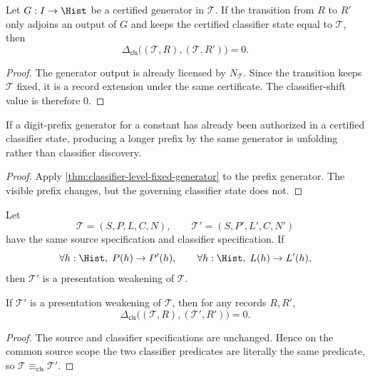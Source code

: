 \begin{theorem}
\label{thm:classifier-level-fixed-generator}
Let $G:I\to\Hist$ be a certified generator in $\mathcal T$. If the transition
from $R$ to $R'$ only adjoins an output of $G$ and keeps the certified
classifier state equal to $\mathcal T$, then
$$
\Delta_{\mathsf{cls}}\bigl((\mathcal T,R),(\mathcal T,R')\bigr)=0.
$$
\end{theorem}
\begin{proof}
The generator output is already licensed by $N_{\mathcal T}$. Since the
transition keeps $\mathcal T$ fixed, it is a record extension under the same
certificate. The classifier-shift value is therefore $0$.
\end{proof}

\begin{corollary}
\label{cor:digit-extension-is-unfolding}
If a digit-prefix generator for a constant has already been authorized in a
certified classifier state, producing a longer prefix by the same generator is
unfolding rather than classifier discovery.
\end{corollary}
\begin{proof}
Apply \autoref{thm:classifier-level-fixed-generator} to the prefix generator.
The visible prefix changes, but the governing classifier state does not.
\end{proof}

\begin{definition}
\label{def:classifier-level-presentation-weakening}
Let
$$
\mathcal T=(S,P,L,C,N),
\qquad
\mathcal T'=(S,P',L',C,N')
$$
have the same source specification and classifier specification. If
$$
\forall h:\Hist,\;P(h)\to P'(h),
\qquad
\forall h:\Hist,\;L(h)\to L'(h),
$$
then $\mathcal T'$ is a presentation weakening of $\mathcal T$.
\end{definition}

\begin{theorem}
\label{thm:presentation-weakening-zero-classifier-shift}
If $\mathcal T'$ is a presentation weakening of $\mathcal T$, then for any
records $R,R'$,
$$
\Delta_{\mathsf{cls}}\bigl((\mathcal T,R),(\mathcal T',R')\bigr)=0.
$$
\end{theorem}
\begin{proof}
The source and classifier specifications are unchanged. Hence on the common
source scope the two classifier predicates are literally the same predicate,
so $\mathcal T\equiv_{\mathsf{cls}}\mathcal T'$.
\end{proof}

